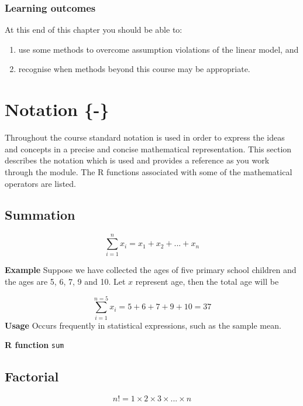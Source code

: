 \documentclass[
  oneside]{krantz}
\providecommand{\tightlist}{%
  \setlength{\itemsep}{0pt}\setlength{\parskip}{0pt}}
\begin{document}
\hypertarget{learning-outcomes-11}{%
\subsection{Learning outcomes}\label{learning-outcomes-11}}

At this end of this chapter you should be able to:

\begin{enumerate}
\def\labelenumi{\arabic{enumi}.}
\tightlist
\item
  use some methods to overcome assumption violations of the linear model, and
\item
  recognise when methods beyond this course may be appropriate.
\end{enumerate}

\hypertarget{notation}{%
\chapter{Notation \{-\}}\label{notation}}

Throughout the course standard notation is used in order to express the ideas and concepts in a precise and concise mathematical representation. This section describes the notation which is used and provides a reference as you work through the module. The R functions associated with some of the mathematical operators are listed.

\hypertarget{summation}{%
\section{Summation}\label{summation}}

\[\sum_{i=1} ^{n} x_i = x_1 + x_2 + ... + x_n\]

\textbf{Example} Suppose we have collected the ages of five primary school children and the ages are 5, 6, 7, 9 and 10. Let \(x\) represent age, then the total age will be

\[ \sum_{i=1}^{n=5}x_i = 5 + 6 + 7 + 9 + 10 = 37\]
\textbf{Usage} Occurs frequently in statistical expressions, such as the sample mean.

\textbf{R function} \texttt{sum}

\hypertarget{factorial}{%
\section{Factorial}\label{factorial}}

\[n! = 1 \times 2 \times 3 \times ... \times n\]
\end{document}
